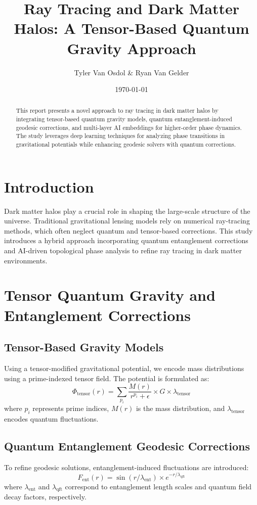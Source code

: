 \documentclass{article}
\title{Ray Tracing and Dark Matter Halos: A Tensor-Based Quantum Gravity Approach}
\author{Tyler Van Osdol \& Ryan Van Gelder}
\date{\today}
\theoremstyle{plain}
\begin{document}
\maketitle
\begin{abstract}
This report presents a novel approach to ray tracing in dark matter halos by integrating tensor-based quantum gravity models, quantum entanglement-induced geodesic corrections, and multi-layer AI embeddings for higher-order phase dynamics. The study leverages deep learning techniques for analyzing phase transitions in gravitational potentials while enhancing geodesic solvers with quantum corrections.
\end{abstract}

\section{Introduction}
Dark matter halos play a crucial role in shaping the large-scale structure of the universe. Traditional gravitational lensing models rely on numerical ray-tracing methods, which often neglect quantum and tensor-based corrections. This study introduces a hybrid approach incorporating quantum entanglement corrections and AI-driven topological phase analysis to refine ray tracing in dark matter environments.

\section{Tensor Quantum Gravity and Entanglement Corrections}
\subsection{Tensor-Based Gravity Models}
Using a tensor-modified gravitational potential, we encode mass distributions using a prime-indexed tensor field. The potential is formulated as:
\begin{equation}
\Phi_{\text{tensor}}(r) = \sum_{p_i} \frac{M(r)}{r^{p_i} + \epsilon} \times G \times \lambda_{\text{tensor}}
\end{equation}
where $p_i$ represents prime indices, $M(r)$ is the mass distribution, and $\lambda_{\text{tensor}}$ encodes quantum fluctuations.

\subsection{Quantum Entanglement Geodesic Corrections}
To refine geodesic solutions, entanglement-induced fluctuations are introduced:
\begin{equation}
F_{\text{ent}}(r) = \sin(r / \lambda_{\text{ent}}) \times e^{-r / \lambda_{\text{qft}}}
\end{equation}
where $\lambda_{\text{ent}}$ and $\lambda_{\text{qft}}$ correspond to entanglement length scales and quantum field decay factors, respectively.
\end{document}
